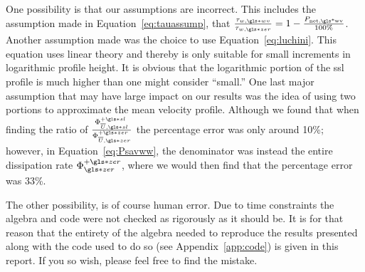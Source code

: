 One possibility is that our assumptions are incorrect. This includes the assumption made in Equation~\eqref{eq:tauassump}, that $\frac{\tau_{w,\gls*{wv}}}{\tau_{w,\gls*{zer}}}=1-\frac{P_\text{net,\gls*{wv}} }{100\%}$. Another assumption made was the choice to use Equation~\eqref{eq:luchini}. This equation uses linear theory and thereby is only suitable for small increments in logarithmic profile height. It is obvious that the logarithmic portion of the \gls*{ssl} profile is much higher than one might consider ``small.'' One last major assumption that may have large impact on our results was the idea of using two portions to approximate the mean velocity profile. Although we found that when finding the ratio of $\frac{\Phi _{\overline{U},\gls*{sl}}\ps}{\Phi _{\overline{U},\gls*{zer}}\pz}$ the percentage error was only around 10\%; however, in Equation~\eqref{eq:Psavww}, the denominator was instead the entire dissipation rate $\Phi _{\gls*{zer}}\pz$, where we would then find that the percentage error was 33\%.

The other possibility, is of course human error. Due to time constraints the algebra and code were not checked as rigorously as it should be. It is for that reason that the entirety of the algebra needed to reproduce the results presented along with the code used to do so (see Appendix~\ref{app:code}) is given in this report. If you so wish, please feel free to find the mistake.
